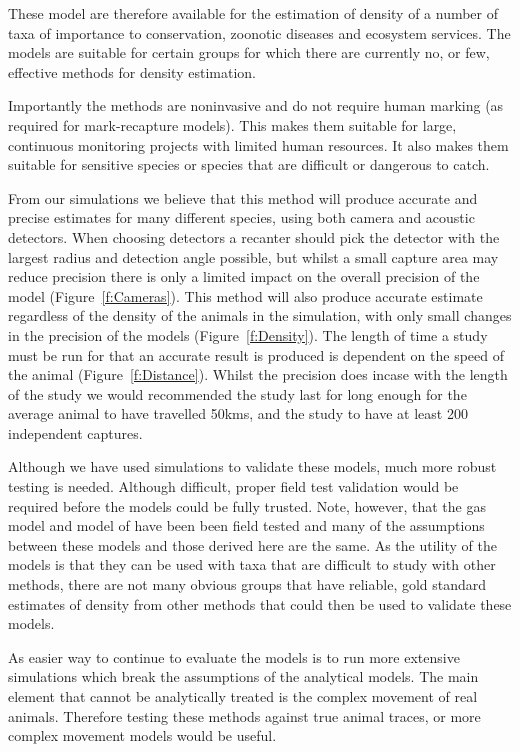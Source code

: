 \documentclass[a4paper,10pt,reqno,oneside]{amsart}
\begin{document}
These model are therefore available for the estimation of density of a number of taxa of importance to conservation, zoonotic diseases and ecosystem services. The models are suitable for certain groups for which there are currently no, or few, effective methods for density estimation. 

Importantly the methods are noninvasive and do not require human marking (as required for mark-recapture models). This makes them suitable for large, continuous monitoring projects with limited human resources. It also makes them suitable for sensitive species or species that are difficult or dangerous to catch.

From our simulations  we believe that this method will produce accurate and precise estimates for many different species, using both camera and acoustic detectors. When choosing detectors a recanter should pick the detector with the largest radius and detection angle possible, but whilst a small capture area may reduce precision there is only a limited impact on the overall precision of the model (Figure~\ref{f:Cameras}). This method will also produce accurate estimate regardless of the density of the animals in the simulation, with only small changes in the precision of the models (Figure~\ref{f:Density}). The length of time a study must be run for that an accurate result is produced is dependent on the speed of the animal (Figure~\ref{f:Distance}). Whilst the precision does incase with the length of the study we would recommended the study last for long enough for the average animal to have travelled 50kms, and the study to have at least 200 independent captures.   

Although we have used simulations to validate these models, much more robust testing is needed. Although difficult, proper field test validation would be required before the models could be fully trusted. Note, however, that the gas model and model of \cite{rowcliffe2008estimating} have been been field tested and many of the assumptions between these models and those derived here are the same. As the utility of the models is that they can be used with taxa that are difficult to study with other methods, there are not many obvious groups that have reliable, gold standard estimates of density from other methods that could then be used to validate these models.

As easier way to continue to evaluate the models is to run more extensive simulations which break the assumptions of the analytical models. The main element that cannot be analytically treated is the complex movement of real animals. Therefore testing these methods against true animal traces, or more complex movement models would be useful.
\end{document}
